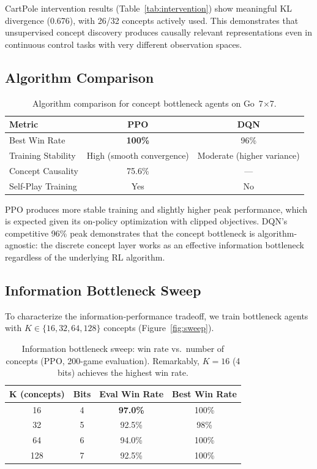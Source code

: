 \documentclass[11pt,a4paper]{article}
\begin{document}
CartPole intervention results (Table~\ref{tab:intervention}) show meaningful KL divergence (0.676), with 26/32 concepts actively used. This demonstrates that unsupervised concept discovery produces causally relevant representations even in continuous control tasks with very different observation spaces.

\subsection{Algorithm Comparison}

\begin{table}[t]
\centering
\caption{Algorithm comparison for concept bottleneck agents on Go~7$\times$7.}
\label{tab:algo_comparison}
\begin{tabular}{lcc}
\toprule
\textbf{Metric} & \textbf{PPO} & \textbf{DQN} \\
\midrule
Best Win Rate          & \textbf{100\%} & 96\% \\
Training Stability     & High (smooth convergence) & Moderate (higher variance) \\
Concept Causality      & 75.6\% & --- \\
Self-Play Training     & Yes    & No \\
\bottomrule
\end{tabular}
\end{table}

PPO produces more stable training and slightly higher peak performance, which is expected given its on-policy optimization with clipped objectives. DQN's competitive 96\% peak demonstrates that the concept bottleneck is algorithm-agnostic: the discrete concept layer works as an effective information bottleneck regardless of the underlying RL algorithm.

\subsection{Information Bottleneck Sweep}

To characterize the information-performance tradeoff, we train bottleneck agents with $K \in \{16, 32, 64, 128\}$ concepts (Figure~\ref{fig:sweep}).

\begin{table}[t]
\centering
\caption{Information bottleneck sweep: win rate vs.\ number of concepts (PPO, 200-game evaluation). Remarkably, $K=16$ (4 bits) achieves the highest win rate.}
\label{tab:sweep}
\begin{tabular}{cccc}
\toprule
\textbf{K (concepts)} & \textbf{Bits} & \textbf{Eval Win Rate} & \textbf{Best Win Rate} \\
\midrule
16  & 4 & \textbf{97.0\%} & 100\% \\
32  & 5 & 92.5\%          & 98\% \\
64  & 6 & 94.0\%          & 100\% \\
128 & 7 & 92.5\%          & 100\% \\
\bottomrule
\end{tabular}
\end{table}
\end{document}
